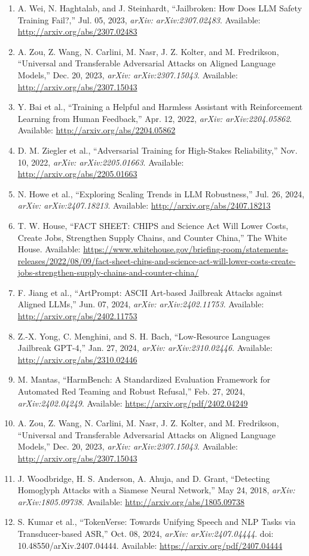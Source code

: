 \documentclass{article} %
\begin{document}
    \begin{enumerate}
        \item A. Wei, N. Haghtalab, and J. Steinhardt, “Jailbroken: How Does LLM Safety Training Fail?,” Jul. 05, 2023, \emph{arXiv: arXiv:2307.02483}. Available: \url{http://arxiv.org/abs/2307.02483}
        \item A. Zou, Z. Wang, N. Carlini, M. Nasr, J. Z. Kolter, and M. Fredrikson, “Universal and Transferable Adversarial Attacks on Aligned Language Models,” Dec. 20, 2023, \emph{arXiv: arXiv:2307.15043}. Available: \url{http://arxiv.org/abs/2307.15043}
        \item Y. Bai et al., “Training a Helpful and Harmless Assistant with Reinforcement Learning from Human Feedback,” Apr. 12, 2022, \emph{arXiv: arXiv:2204.05862}. Available: \url{http://arxiv.org/abs/2204.05862}
        \item D. M. Ziegler et al., “Adversarial Training for High-Stakes Reliability,” Nov. 10, 2022, \emph{arXiv: arXiv:2205.01663}. Available: \url{http://arxiv.org/abs/2205.01663}
        \item N. Howe et al., “Exploring Scaling Trends in LLM Robustness,” Jul. 26, 2024, \emph{arXiv: arXiv:2407.18213}. Available: \url{http://arxiv.org/abs/2407.18213}
        \item T. W. House, “FACT SHEET: CHIPS and Science Act Will Lower Costs, Create Jobs, Strengthen Supply Chains, and Counter China,” The White House. Available: \url{https://www.whitehouse.gov/briefing-room/statements-releases/2022/08/09/fact-sheet-chips-and-science-act-will-lower-costs-create-jobs-strengthen-supply-chains-and-counter-china/}
        \item F. Jiang et al., “ArtPrompt: ASCII Art-based Jailbreak Attacks against Aligned LLMs,” Jun. 07, 2024, \emph{arXiv: arXiv:2402.11753}. Available: \url{http://arxiv.org/abs/2402.11753}
        \item Z.-X. Yong, C. Menghini, and S. H. Bach, “Low-Resource Languages Jailbreak GPT-4,” Jan. 27, 2024, \emph{arXiv: arXiv:2310.02446}. Available: \url{http://arxiv.org/abs/2310.02446}
        \item M. Mantas, “HarmBench: A Standardized Evaluation Framework for Automated Red Teaming and Robust Refusal,” Feb. 27, 2024, \emph{arXiv:2402.04249}. Available: \url{https://arxiv.org/pdf/2402.04249}
        \item A. Zou, Z. Wang, N. Carlini, M. Nasr, J. Z. Kolter, and M. Fredrikson, “Universal and Transferable Adversarial Attacks on Aligned Language Models,” Dec. 20, 2023, \emph{arXiv: arXiv:2307.15043}. Available: \url{http://arxiv.org/abs/2307.15043}
        \item J. Woodbridge, H. S. Anderson, A. Ahuja, and D. Grant, “Detecting Homoglyph Attacks with a Siamese Neural Network,” May 24, 2018, \emph{arXiv: arXiv:1805.09738}. Available: \url{http://arxiv.org/abs/1805.09738}
        \item S. Kumar et al., “TokenVerse: Towards Unifying Speech and NLP Tasks via Transducer-based ASR,” Oct. 08, 2024, \emph{arXiv: arXiv:2407.04444}. doi: 10.48550/arXiv.2407.04444. Available: \url{https://arxiv.org/pdf/2407.04444}
    \end{enumerate}
\end{document}
